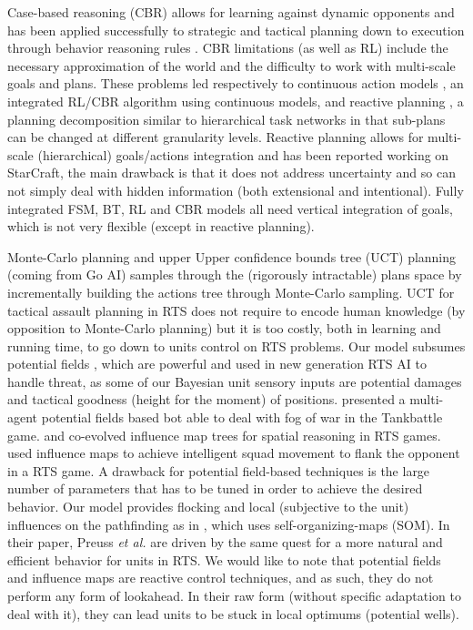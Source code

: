 Case-based reasoning (CBR) allows for learning against dynamic opponents \citep{LTW} and has been applied successfully to strategic and tactical planning down to execution through behavior reasoning rules \citep{Ontanon2007}. CBR limitations (as well as RL) include the necessary approximation of the world and the difficulty to work with multi-scale goals and plans. These problems led respectively to continuous action models \citep{Molineaux08}, an integrated RL/CBR algorithm using continuous models, and reactive planning \citep{WeberCIG10}, a planning decomposition similar to hierarchical task networks \citep{HTNPlanning} in that sub-plans can be changed at different granularity levels. Reactive planning allows for multi-scale (hierarchical) goals/actions integration and has been reported working on StarCraft, the main drawback is that it does not address uncertainty and so can not simply deal with hidden information (both extensional and intentional). 
Fully integrated FSM, BT, RL and CBR models all need vertical integration of goals, which is not very flexible (except in reactive planning).

Monte-Carlo planning \citep{Chung05} and upper Upper 
confidence bounds tree (UCT) planning (coming from Go AI) \citep{UCT} 
 samples through the (rigorously intractable) plans space by 
incrementally building the actions tree through Monte-Carlo sampling. 
UCT for tactical assault planning \citep{UCT} in RTS does not require to encode human knowledge (by opposition to Monte-Carlo planning) but it is too costly, both in learning and running time, to go down to units control on RTS problems. 
Our model subsumes potential fields \citep{Hagelback2009}, which are powerful and used in new generation RTS AI to handle threat, as some of our Bayesian unit sensory inputs are potential damages and tactical goodness (height for the moment) of positions. \cite{HagelbackJ08} presented a multi-agent potential fields based bot able to deal with fog of war in the Tankbattle game. \cite{Avery09} and \cite{SmithCIG10} co-evolved influence map trees for spatial reasoning in RTS games. \cite{Danielsiek_2008} used influence maps to achieve intelligent squad movement to flank the opponent in a RTS game. A drawback for potential field-based techniques is the large number of parameters that has to be tuned in order to achieve the desired behavior. 
Our model provides flocking and local (subjective to the unit) influences on the pathfinding as in \citep{teamCompositionRTS}, which uses self-organizing-maps (SOM). In their paper, Preuss \textit{et al.} are driven by the same quest for a more natural and efficient behavior for units in RTS. 
We would like to note that potential fields and influence maps are reactive control techniques, and as such, they do not perform any form of lookahead. In their raw form (without specific adaptation to deal with it), they can lead units to be stuck in local optimums (potential wells). 


